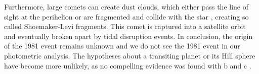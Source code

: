 %
Furthermore, large comets can create dust clouds, which either pass the line of sight at the perihelion or are fragmented and collide with the star \citep{Lamers_1997}, creating so called Shoemaker-Levi fragments.  
%
This comet is captured into a satellite orbit and eventually broken apart by tidal disruption events. 
In conclusion, the origin of the 1981 event remains unknown and we do not see the 1981 event in our photometric analysis.
%
The hypotheses about a transiting planet or its Hill sphere have become more unlikely, as no compelling evidence was found with \pic b and \pic c \citep{Lecavelier_Des_Etangs_1997, Kenworthy_2021}.





